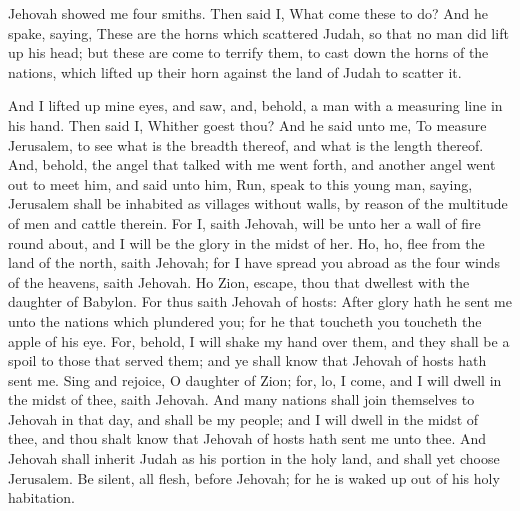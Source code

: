Jehovah showed me four smiths. Then said I, What come these to do? And he spake, saying, These are the horns which scattered Judah, so that no man did lift up his head; but these are come to terrify them, to cast down the horns of the nations, which lifted up their horn against the land of Judah to scatter it. 

And I lifted up mine eyes, and saw, and, behold, a man with a measuring line in his hand. Then said I, Whither goest thou? And he said unto me, To measure Jerusalem, to see what is the breadth thereof, and what is the length thereof. And, behold, the angel that talked with me went forth, and another angel went out to meet him, and said unto him, Run, speak to this young man, saying, Jerusalem shall be inhabited as villages without walls, by reason of the multitude of men and cattle therein. For I, saith Jehovah, will be unto her a wall of fire round about, and I will be the glory in the midst of her.  Ho, ho, flee from the land of the north, saith Jehovah; for I have spread you abroad as the four winds of the heavens, saith Jehovah. Ho Zion, escape, thou that dwellest with the daughter of Babylon. For thus saith Jehovah of hosts: After glory hath he sent me unto the nations which plundered you; for he that toucheth you toucheth the apple of his eye. For, behold, I will shake my hand over them, and they shall be a spoil to those that served them; and ye shall know that Jehovah of hosts hath sent me. Sing and rejoice, O daughter of Zion; for, lo, I come, and I will dwell in the midst of thee, saith Jehovah. And many nations shall join themselves to Jehovah in that day, and shall be my people; and I will dwell in the midst of thee, and thou shalt know that Jehovah of hosts hath sent me unto thee. And Jehovah shall inherit Judah as his portion in the holy land, and shall yet choose Jerusalem. Be silent, all flesh, before Jehovah; for he is waked up out of his holy habitation. 

